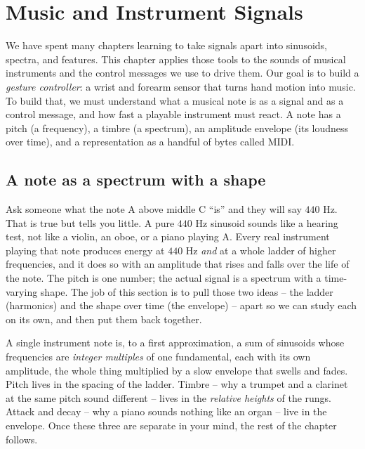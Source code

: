 \chapter{Music and Instrument Signals}

We have spent many chapters learning to take signals apart into sinusoids, spectra, and features. This chapter applies those tools to the sounds of musical instruments and the control messages we use to drive them. Our goal is to build a \emph{gesture controller}: a wrist and forearm sensor that turns hand motion into music. To build that, we must understand what a musical note is as a signal and as a control message, and how fast a playable instrument must react. A note has a pitch (a frequency), a timbre (a spectrum), an amplitude envelope (its loudness over time), and a representation as a handful of bytes called MIDI.

\section{A note as a spectrum with a shape}
\label{ch29:note-is-spectrum}

Ask someone what the note A above middle C ``is'' and they will say $440$ Hz. That is true but tells
you little. A pure $440$ Hz sinusoid sounds like a hearing test, not like a violin, an oboe, or a
piano playing A. Every real instrument playing that note produces energy at $440$ Hz \emph{and} at a
whole ladder of higher frequencies, and it does so with an amplitude that rises and falls over the
life of the note. The pitch is one number; the actual signal is a spectrum with a time-varying shape.
The job of this section is to pull those two ideas -- the ladder (harmonics) and the shape over time
(the envelope) -- apart so we can study each on its own, and then put them back together.

\begin{intuitionbox}
A single instrument note is, to a first approximation, a sum of sinusoids whose frequencies are
\emph{integer multiples} of one fundamental, each with its own amplitude, the whole thing multiplied
by a slow envelope that swells and fades. Pitch lives in the spacing of the ladder. Timbre -- why a
trumpet and a clarinet at the same pitch sound different -- lives in the \emph{relative heights} of
the rungs. Attack and decay -- why a piano sounds nothing like an organ -- live in the envelope. Once
these three are separate in your mind, the rest of the chapter follows.
\end{intuitionbox}

